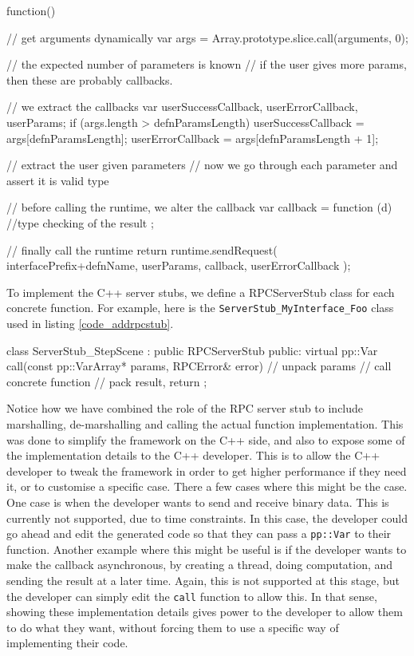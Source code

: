 \begin{code}
function(){
  // get arguments dynamically
  var args = Array.prototype.slice.call(arguments, 0);

  // the expected number of parameters is known
  // if the user gives more params, then these are probably callbacks.

  // we extract the callbacks
  var userSuccessCallback, userErrorCallback, userParams;
  if (args.length > defnParamsLength) {
    userSuccessCallback = args[defnParamsLength];
    userErrorCallback = args[defnParamsLength + 1];
  }

  // extract the user given parameters
  // now we go through each parameter and assert it is valid type

  // before calling the runtime, we alter the callback
  var callback = function (d) {
    //type checking of the result
  };


  // finally call the runtime
  return runtime.sendRequest(
    interfacePrefix+defnName, 
    userParams, 
    callback, 
    userErrorCallback
  );
}
\end{code}

To implement the C++ server stubs, we define a RPCServerStub class for each concrete function. For example, here is the \lstinline{ServerStub_MyInterface_Foo} class used in listing \ref{code_addrpcstub}.

\begin{code}
class ServerStub_StepScene : public RPCServerStub{
public:
	virtual pp::Var call(const pp::VarArray* params, RPCError& error){
		// unpack params
		// call concrete function
		// pack result, return
	}
};
\end{code}

Notice how we have combined the role of the RPC server stub to include marshalling, de-marshalling and calling the actual function implementation. This was done to simplify the framework on the C++ side, and also to expose some of the implementation details to the C++ developer. This is to allow the C++ developer to tweak the framework in order to get higher performance if they need it, or to customise a specific case. There a few cases where this might be the case. One case is when the developer wants to send and receive binary data. This is currently not supported, due to time constraints. In this case, the developer could go ahead and edit the generated code so that they can pass a \lstinline{pp::Var} to their function. Another example where this might be useful is if the developer wants to make the callback asynchronous, by creating a thread, doing computation, and sending the result at a later time. Again, this is not supported at this stage, but the developer can simply edit the \lstinline{call} function to allow this. In that sense, showing these implementation details gives power to the developer to allow them to do what they want, without forcing them to use a specific way of implementing their code.

